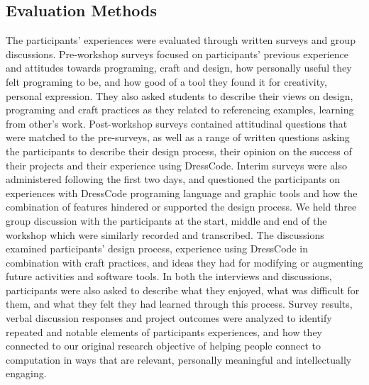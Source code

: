 \documentclass{sigchi}
\begin{document}
\subsection{Evaluation Methods}
The participants' experiences were evaluated through written surveys and group discussions. Pre-workshop surveys focused on participants' previous experience and attitudes towards programing, craft and design, how personally useful they felt programing to be, and how good of a tool they found it for creativity, personal expression. They also asked students to describe their views on design, programing and craft practices as they related to referencing examples, learning from other's work. Post-workshop surveys contained attitudinal questions that were matched to the pre-surveys, as well as a range of written questions asking the participants to describe their design process, their opinion on the success of their projects and their experience using DressCode. Interim surveys were also administered following the first two days, and questioned the participants on experiences with DressCode programing language and graphic tools and how the combination of features hindered or supported the design process. We held three group discussion with the participants at the start, middle and end of the workshop which were similarly recorded and transcribed. The discussions examined participants' design process, experience using DressCode in combination with craft practices, and ideas they had for modifying or augmenting future activities and software tools. In both the interviews and discussions, participants were also asked to describe what they enjoyed, what was difficult for them, and what they felt they had learned through this process. Survey results, verbal discussion responses and project outcomes were analyzed to identify repeated and notable elements of participants experiences, and how they connected to our original research objective of helping people connect to computation in ways that are relevant, personally meaningful and intellectually engaging.
\end{document}
